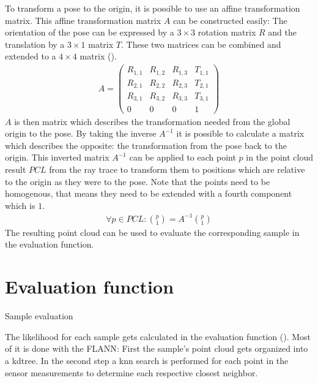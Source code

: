 \documentclass[Thesis.tex]{subfiles}
\begin{document}
To transform a pose to the origin, it is possible to use an affine transformation matrix. This affine transformation matrix $A$ can be constructed easily: The orientation of the pose can be expressed by a $3\times3$ rotation matrix $R$ and the translation by a $3\times1$ matrix $T$. These two matrices can be combined and extended to a $4\times4$ matrix ().
\begin{align}
A = \left(\begin{array}{cccc}
      R_{1,1} & R_{1,2} & R_{1,3} & T_{1,1} \\ 
      R_{2,1} & R_{2,2} & R_{2,3} & T_{2,1} \\ 
      R_{3,1} & R_{3,2} & R_{3,3} & T_{3,1} \\
         0    &    0    &    0    &    1
    \end{array}\right)\label{form:affinetransmatrix}
\end{align}
$A$ is then matrix which describes the transformation needed from the global origin to the pose. By taking the inverse $A^{-1}$ it is possible to calculate a matrix which describes the opposite: the transformation from the pose back to the origin. This inverted matrix $A^{-1}$ can be applied to each point $p$ in the point cloud result $PCL$ from the ray trace to transform them to positions which are relative to the origin as they were to the pose. Note that the points need to be homogenous, that means they need to be extended with a fourth component which is $1$.
%
\begin{align}
  \forall p \in PCL: \genfrac{(}{)}{0pt}{0}{p}{1} = A^{-1} \genfrac{(}{)}{0pt}{0}{p}{1}
\end{align}
%
The resulting point cloud can be used to evaluate the corresponding sample in the evaluation function.
%
%
%
\section{Evaluation function}
%
\begin{algorithm}[!htp]
\caption{Sample evaluation}
\label{alg:eval}

\end{algorithm}
The likelihood for each sample gets calculated in the evaluation function (). Most of it is done with the \gls{FLANN}: First the sample's point cloud gets organized into a \gls{kdtree}. In the second step a \gls{knn} search is performed for each point in the sensor measurements to determine each respective closest neighbor. 
\end{document}
